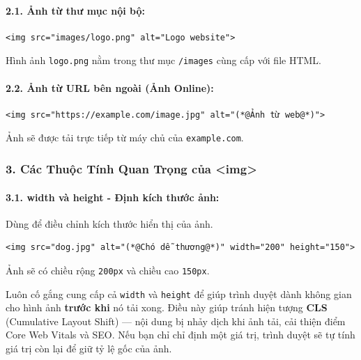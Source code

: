 \documentclass[11pt,oneside]{book}
\newcommand{\codeinline}[1]{\textcolor{accentOrange}{\texttt{#1}}}
\begin{document}
\paragraph{2.1. Ảnh từ thư mục nội bộ:}
\begin{codeWindow}
\begin{lstlisting}[language=HTML5]
<img src="images/logo.png" alt="Logo website">
\end{lstlisting}
\end{codeWindow}

Hình ảnh \codeinline{logo.png} nằm trong thư mục \codeinline{/images} cùng cấp với file HTML.

\paragraph{2.2. Ảnh từ URL bên ngoài (Ảnh Online):}
\begin{codeWindow}
\begin{lstlisting}[language=HTML5]
<img src="https://example.com/image.jpg" alt="(*@Ảnh từ web@*)">
\end{lstlisting}
\end{codeWindow}

Ảnh sẽ được tải trực tiếp từ máy chủ của \codeinline{example.com}.

\subsubsection{3. Các Thuộc Tính Quan Trọng của <img>}

\paragraph{3.1. width và height - Định kích thước ảnh:}
Dùng để điều chỉnh kích thước hiển thị của ảnh.

\begin{codeWindow}
\begin{lstlisting}[language=HTML5]
<img src="dog.jpg" alt="(*@Chó dễ thương@*)" width="200" height="150">
\end{lstlisting}
\end{codeWindow}

Ảnh sẽ có chiều rộng \codeinline{200px} và chiều cao \codeinline{150px}.

\begin{tipBox}
Luôn cố gắng cung cấp cả \codeinline{width} và \codeinline{height} để giúp trình duyệt dành không gian cho hình ảnh \textbf{trước khi} nó tải xong. Điều này giúp tránh hiện tượng \textbf{CLS} (Cumulative Layout Shift) — nội dung bị nhảy dịch khi ảnh tải, cải thiện điểm Core Web Vitals và SEO. Nếu bạn chỉ chỉ định một giá trị, trình duyệt sẽ tự tính giá trị còn lại để giữ tỷ lệ gốc của ảnh.
\end{tipBox}
\end{document}
